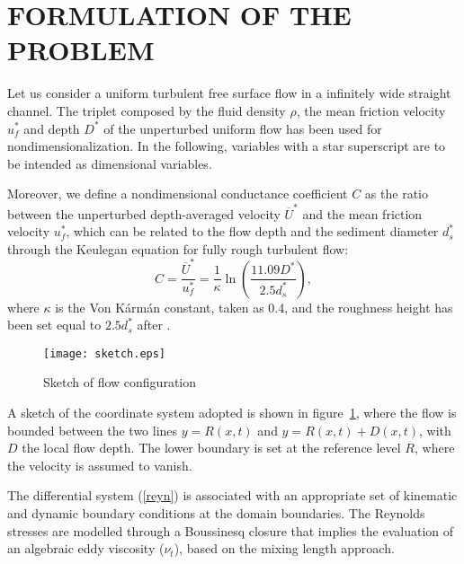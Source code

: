 \documentclass[12pt,a4paper,twocolumn,fleqn]{narms}
\begin{document}
\section{FORMULATION OF THE PROBLEM}
\label{sec:exp}

Let us consider a uniform turbulent free surface flow in a
infinitely wide straight channel. The triplet composed by the
fluid density $\rho$, the mean friction velocity $u_f^*$ and depth
$D^*$ of the unperturbed uniform flow has been used for
nondimensionalization. In the following, variables with a star
superscript are to be intended as dimensional variables.

Moreover, we define a nondimensional conductance coefficient $C$
as the ratio between the unperturbed depth-averaged velocity
$\overline{U}^*$ and the mean friction velocity $u^*_f$, which can
be related to the flow depth and the sediment diameter $d^*_s$
through the Keulegan equation  for fully rough
turbulent flow: \begin{equation}
C=\frac{\overline{U}^*}{u^*_f}=\frac{1}{\kappa}\ln{\left(\frac{11.09
D^*}{2.5 d^*_s}\right)}, \label{keurough} \end{equation} where
$\kappa$ is the Von K\'arm\'an constant, taken as 0.4, and the
roughness height has been set equal to $2.5 d^*_s$ after
.


\begin{figure}
\centerline{
\texttt{[image: sketch.eps]}
}
\caption{Sketch of flow configuration}
\label{f:sketch1}
\end{figure}

A sketch of the coordinate system adopted is shown in
figure~\ref{f:sketch1}, where the flow is bounded between the two
lines $y=R(x,t)$ and $y=R(x,t)+D(x,t)$, with $D$ the local flow
depth. The lower boundary is set at the reference level $R$, where the
velocity is assumed to vanish.

The differential system (\ref{reyn}) is associated with
an appropriate set of kinematic and dynamic boundary conditions at the
domain boundaries. The Reynolds stresses are modelled through a
Boussinesq closure that implies the evaluation of an algebraic eddy
viscosity ($\nu_t$), based on the mixing length approach.
\end{document}
